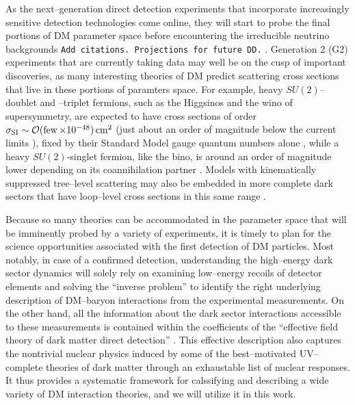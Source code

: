 \documentclass[11pt]{article}
\newcommand{\tenx}[1]{\times 10^{#1}}
\newcommand{\sjwColor}{red}
\newcommand{\sjwtt}[1]{{\color{\sjwColor}\tt #1}}
\begin{document}
As the next--generation direct detection experiments that incorporate increasingly sensitive detection technologies come online, they will start to probe the final portions of DM parameter space before encountering the irreducible neutrino backgrounds \sjwtt{Add citations. Projections for future DD.} \cite{Cushman:2013zza,Billard:2013qya,Ruppin:2014bra,Davis:2014ama,Dent:2016iht}. Generation 2 (G2) experiments that are currently taking data \cite{} may well be on the cusp of important discoveries, as many interesting theories of DM predict scattering cross sections that live in these portions of paramters space. For example, heavy $SU(2)$--doublet and --triplet fermions, such as the Higgsinos and the wino of supersymmetry, are expected to have cross sections of order $\sigma_{\rm SI} \sim \cO(\few\tenx{-48})\cm^2$ (just about an order of magnitude below the current limits \cite{}), fixed by their Standard Model gauge quantum numbers alone \cite{Hill:2011be,Hill:2013hoa,Hill:2014yxa}, while a heavy $SU(2)$-singlet fermion, like the bino, is around an order of magnitude lower depending on its coannihilation partner \cite{Berlin:2015njh}. Models with kinematically suppressed tree--level scattering may also be embedded in more complete dark sectors that have loop--level cross sections in this same range \cite{Ipek:2014gua,McDermott:2014rqa,Appelquist:2015yfa,Appelquist:2015zfa}.

Because so many theories can be accommodated in the parameter space that will be imminently probed by a variety of experiments, it is timely to plan for the science opportunities associated with the first detection of DM particles. Most notably, in case of a confirmed detection, understanding the high--energy dark sector dynamics will solely rely on examining low--energy recoils of detector elements and solving the ``inverse problem'' to identify the right underlying description of DM--baryon interactions from the experimental measurements. On the other hand, all the information about the dark sector interactions accessible to these measurements is contained within the coefficients of the ``effective field theory of dark matter direct detection'' \cite{Fitzpatrick:2012ix, Anand:2013yka}. This effective description also captures the nontrivial nuclear physics induced by some of the best--motivated UV--complete theories of dark matter \cite{Gresham:2014vja, Gluscevic:2015sqa} through an exhaustable list of nuclear responses. It thus provides a systematic framework for calssifying and describing a wide variety of DM interaction theories, and we will utilize it in this work. 
 
\end{document}
